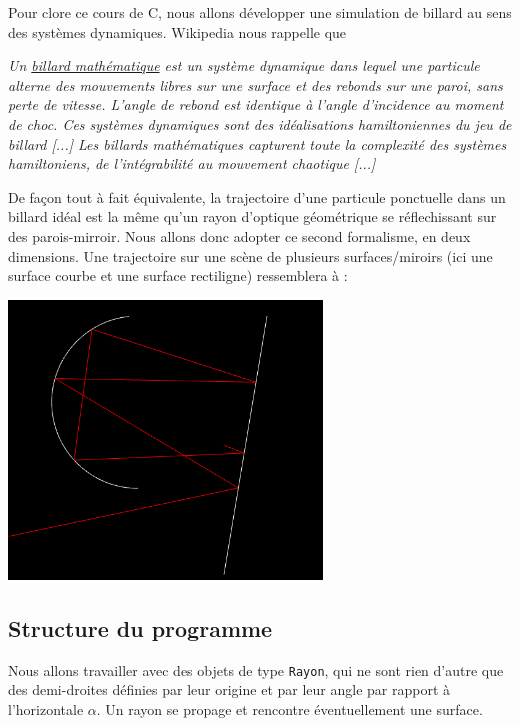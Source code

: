 \documentclass{book}
\newcommand{\inline}[1]{\texttt{#1}}
\newcommand{\cpp}{\mbox{C\vspace{.5em}\protect\raisebox{.2ex}{\footnotesize++~}}}
\begin{document}
Pour clore ce cours de \cpp, nous allons développer une simulation de billard au sens des systèmes dynamiques. Wikipedia nous rappelle que

\begin{displayquote}
\textit{Un \href{https://fr.wikipedia.org/wiki/Billard_(mathématiques)}{billard mathématique} est un système dynamique dans lequel une particule alterne des mouvements libres sur une surface et des rebonds sur une paroi, sans perte de vitesse. L'angle de rebond est identique à l'angle d'incidence au moment de choc. Ces systèmes dynamiques sont des idéalisations hamiltoniennes du jeu de billard [...] Les billards mathématiques capturent toute la complexité des systèmes hamiltoniens, de l'intégrabilité au mouvement chaotique [...]}
\end{displayquote}

De façon tout à fait équivalente, la trajectoire d'une particule ponctuelle dans un billard idéal est la même qu'un rayon d'optique géométrique se réflechissant sur des parois-mirroir. Nous allons donc adopter ce second formalisme, en deux dimensions. Une trajectoire sur une scène de plusieurs surfaces/miroirs (ici une surface courbe et une surface rectiligne) ressemblera à :

\begin{center}
  \includegraphics[height=20em]{TD5bis/reflections-exemples.png}
\end{center}

\subsection{Structure du programme}

Nous allons travailler avec des objets de type \inline{Rayon}, qui ne sont rien d'autre que des demi-droites définies par leur origine et par leur angle par rapport à l'horizontale $\alpha$. Un rayon se propage et rencontre éventuellement une surface.
\end{document}
